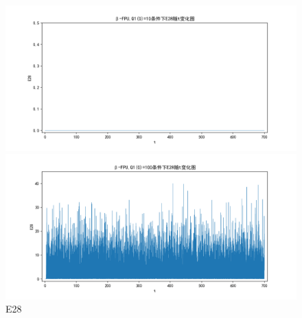 \documentclass[10pt, a4paper]{article}
\begin{document}
    \begin{figure}[H]
        \begin{minipage}[t]{0.49\textwidth}
            \centering
            \includegraphics[width=\textwidth]{./q6_pics/cmp/E28.png}
        \end{minipage}
        \begin{minipage}[t]{0.49\textwidth}
            \centering
            \includegraphics[width=\textwidth]{./q6_pics/exp/E28.png}
        \end{minipage}
        \caption{E28}\label{fig:E28 in q6}
    \end{figure}
\end{document}
